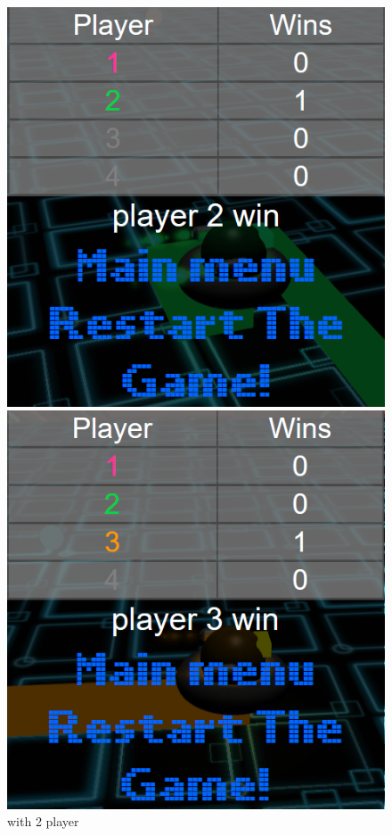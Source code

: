 \documentclass[11pt]{article}
\begin{document}
\begin{figure}
	\centering
	\begin{minipage}[b]{0.3005\linewidth}
		\includegraphics[width=\linewidth]{endGameMenu2}
		\caption{with 2 player}
		\label{fig:endGameMenu2}
	\end{minipage}
	\begin{minipage}[b]{0.3015\linewidth}
		\includegraphics[width=\linewidth]{endGameMenu3}

\end{minipage}
\end{figure}
\end{document}
